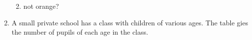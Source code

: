\begin{enumerate}[noitemsep, label=\textbf{\arabic*}. ]
\begin{enumerate}[noitemsep, label=\textbf{\alph*}. ]
\label{m39377*uid83}\item not orange?
\end{enumerate}
                \label{m39377*uid84}\item A small private school has a class with children of
various ages. The table gies the number of pupils of each age in the class.
    \setlength\mytablespace{12\tabcolsep}
    \addtolength\mytablespace{7\arrayrulewidth}
    \setlength\mytablewidth{\linewidth}
    \setlength\mytableroom{\mytablewidth}
    \addtolength\mytableroom{-\mytablespace}
    \setlength\myfixedwidth{0pt}
    \setlength\mystarwidth{\mytableroom}
        \addtolength\mystarwidth{-\myfixedwidth}
        \divide{}
\end{enumerate}
